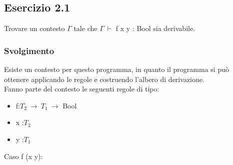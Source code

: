     \vspace*{1 cm}

\subsection*{Esercizio 2.1}
Trovare un contesto $\Gamma$ tale che $\Gamma\:\vdash$ f x y : Bool sia derivabile.

\subsubsection*{Svolgimento}
 	\begin{prooftree} 
	\end{prooftree} 
	
	Esiste un contesto per questo programma, in quanto il programma si pu\`o ottenere applicando le regole e costruendo l'albero di derivazione. \\
	Fanno parte del contesto le seguenti regole di tipo:
\begin{itemize}
	\item f:$T_2\:\rightarrow\:T_1\:\rightarrow$ Bool
	\item x :$T_2$
	\item y :$T_1$
\end{itemize}

\vspace*{2 cm}
Caso f (x y):\\
 	\begin{prooftree} 
	\end{prooftree} 
	
